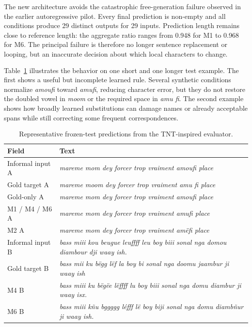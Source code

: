 \documentclass[12pt, a4paper, twoside, openany]{report}
\begin{document}
The new architecture avoids the catastrophic free-generation failure observed in the earlier autoregressive pilot. Every final prediction is non-empty and all conditions produce 29 distinct outputs for 29 inputs. Prediction length remains close to reference length: the aggregate ratio ranges from 0.948 for M1 to 0.968 for M6. The principal failure is therefore no longer sentence replacement or looping, but an inaccurate decision about which local characters to change.

Table~\ref{tab:prediction-example} illustrates the behavior on one short and one longer test example. The first shows a useful but incomplete learned rule. Several synthetic conditions normalize \textit{amoufi} toward \textit{amufi}, reducing character error, but they do not restore the doubled vowel in \textit{moom} or the required space in \textit{amu fi}. The second example shows how broadly learned substitutions can damage names or already acceptable spans while still correcting some frequent correspondences.

\begin{table}[H]
	\centering
	\caption{Representative frozen-test predictions from the TNT-inspired evaluator.}
	\label{tab:prediction-example}
	\small
	\begin{tabularx}{\textwidth}{>{\raggedright\arraybackslash}p{2.6cm}X}
		\toprule
		\textbf{Field} & \textbf{Text} \\
		\midrule
		Informal input A & \textit{mareme mom dey forcer trop vraiment amoufi place} \\
		Gold target A & \textit{mareme moom dey forcer trop vraiment amu fi place} \\
		Gold-only A & \textit{mareme mom dey forcer trop vraiment amoufi place} \\
		M1 / M4 / M6 A & \textit{mareme mom dey forcer trop vraiment amufi place} \\
		M2 A & \textit{mareme mom dey forcer trop vraiment amëfi place} \\
		\addlinespace
		Informal input B & \textit{bass miii kou beugue leuffff leu boy biii sonal nga domou diambour dji waay ish.} \\
		Gold target B & \textit{bass mii ku bëgg lëf la boy bi sonal nga doomu jaambur ji waay ish} \\
		M4 B & \textit{bass miii ku bëgëe lëffff lu boy biii sonal nga domu diambur ji waay isx.} \\
		M6 B & \textit{bass miii kñu bggggg léfff lë boy biji sonal nga domu diambñur ji waay ish.} \\
		\bottomrule
	\end{tabularx}
\end{table}
\end{document}

